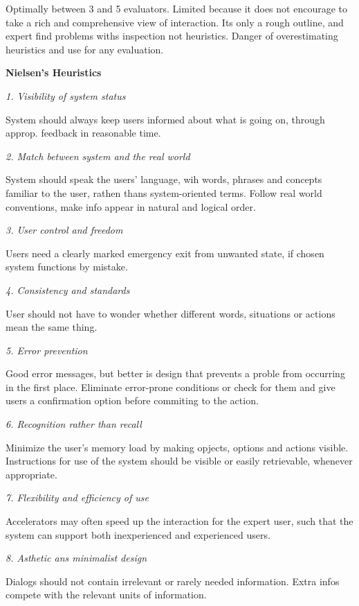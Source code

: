 Optimally between 3 and 5 evaluators. Limited because it does not encourage to take a rich and comprehensive view of interaction. Its only a rough outline, and expert find problems withs inspection not heuristics. 
Danger of overestimating heuristics and use for any evaluation. \medskip

\textbf{Nielsen's Heuristics} \smallskip


\textit{1. Visibility of system status} \smallskip

System should always keep users informed about what is going on, through approp. feedback in reasonable time. \medskip

\textit{2. Match between system and the real world} \smallskip

System should speak the users' language, wih words, phrases and concepts familiar to the user, rathen thans system-oriented terms. Follow real world conventions, make info appear in natural and logical order. \medskip

\textit{3. User control and freedom} \smallskip

Users need a clearly marked emergency exit from unwanted state, if chosen system functions by mistake. \medskip

\textit{4. Consistency and standards} \smallskip

User should not have to wonder whether different words, situations or actions mean the same thing. \medskip

\textit{5. Error prevention} \smallskip

Good error messages, but better is design that prevents a proble  from occurring in the first place. Eliminate error-prone conditions or check for them and give users a confirmation option before commiting to the action. \medskip

\textit{6. Recognition rather than recall} \smallskip

Minimize the user's memory load by making opjects, options and actions visible. Instructions for use of the system should be visible or easily retrievable, whenever appropriate. \medskip

\textit{7. Flexibility and efficiency of use} \smallskip

Accelerators may often speed up the interaction for the expert user, such that the system can support both inexperienced and experienced users. \medskip

\textit{8. Asthetic ans minimalist design} \smallskip

Dialogs should not contain irrelevant or rarely needed information. Extra infos compete with the relevant units of information. \medskip


